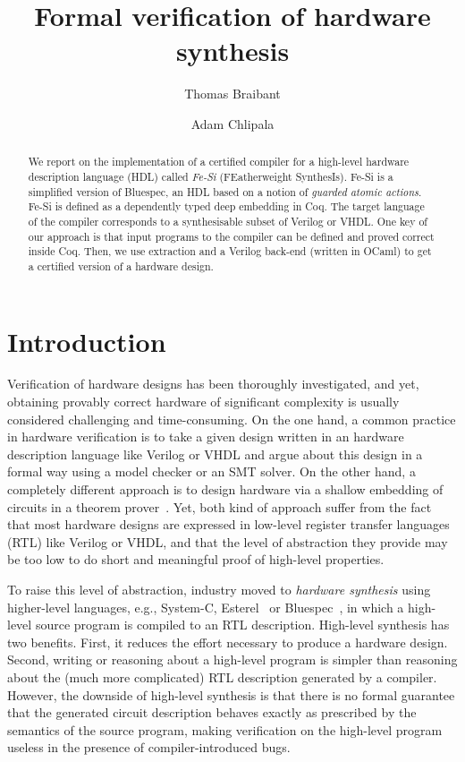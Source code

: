 \documentclass{llncs}
\author{Thomas Braibant \and Adam Chlipala}
\institute{}
\title{Formal verification of hardware synthesis}
\begin{document}
\maketitle

\begin{abstract}
  We report on the implementation of a certified compiler for a
  high-level hardware description language (HDL) called \emph{Fe-Si}
  (FEatherweight SynthesIs).
  Fe-Si is a simplified version of Bluespec, an HDL based on a notion
  of \emph{guarded atomic actions}. Fe-Si is defined as a
  dependently typed deep embedding in Coq. The target language of the
  compiler corresponds to a synthesisable subset of Verilog or VHDL.
  One key of our approach is that input programs to the compiler can
  be defined and proved correct inside Coq. Then, we use extraction
  and a Verilog back-end (written in OCaml) to get a certified version
  of a hardware design.
\end{abstract}

\section*{Introduction}
Verification of hardware designs has been thoroughly investigated, and
yet, obtaining provably correct hardware of significant complexity is
usually considered challenging and time-consuming. 
%
On the one hand, a common practice in hardware verification is to take
a given design written in an hardware description language like
Verilog or VHDL and argue about this design in a formal way using a
model checker or an SMT solver.
%
On the other hand, a completely different approach is to design
hardware via a shallow embedding of circuits in a theorem
prover~\cite{hanna-veritas,UCAM-CL-TR-77,hunt89,vamp,certifying-circuits-in-type-theory}.
%
Yet, both kind of approach suffer from the fact that most hardware
designs are expressed in low-level register transfer languages (RTL)
like Verilog or VHDL, and that the level of abstraction they provide
may be too low to do short and meaningful proof of high-level
properties.

\medskip

To raise this level of abstraction, industry moved to \emph{hardware
  synthesis} using higher-level languages, e.g., System-C,
Esterel~\cite{DBLP:conf/birthday/Berry00} or Bluespec~\cite{bluespec},
in which a high-level source program is compiled to an RTL
description.
%
High-level synthesis has two benefits. 
%
First, it reduces the effort necessary to produce a hardware design.
%
Second, writing or reasoning about a high-level program is simpler
than reasoning about the (much more complicated) RTL description
generated by a compiler.
%
However, the downside of high-level synthesis is that there is no
formal guarantee that the generated circuit description behaves
exactly as prescribed by the semantics of the source
program, making verification on the high-level program useless in the
presence of compiler-introduced bugs.
%
\end{document}
